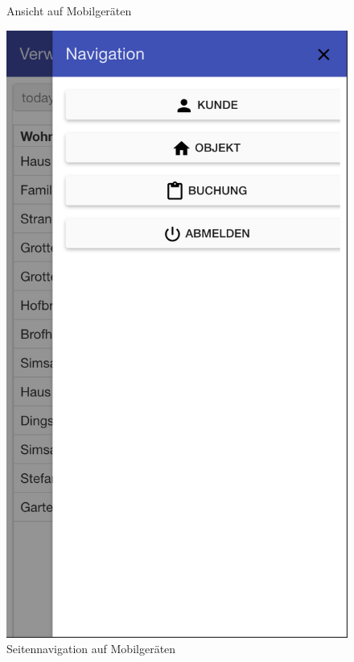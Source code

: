 \begin{figure}[H]
\begin{minipage}[t]{0.49\linewidth}
        \caption{Ansicht auf Mobilgeräten}
        \label{frontend_header_small}
    \end{minipage}
    \hfill
    \begin{minipage}[t]{0.49\linewidth}
        \centering
        \includegraphics[width=\linewidth]{images/frontend_header_small_navigation.png}
        \caption{Seitennavigation auf Mobilgeräten}
        \label{frontend_header_small_navigation}
    \end{minipage}
\end{figure}


